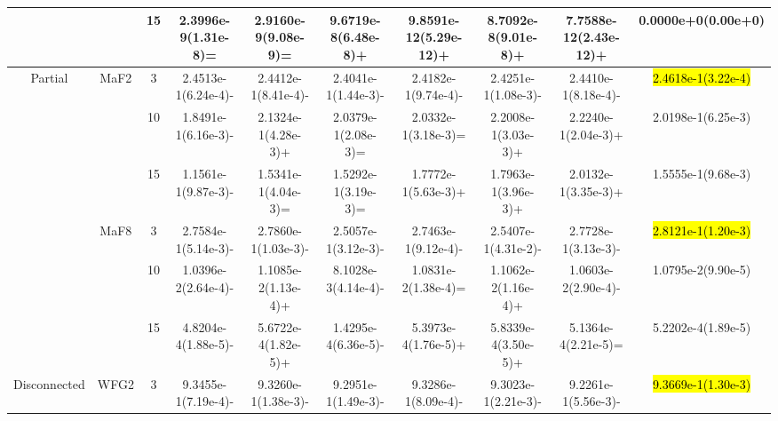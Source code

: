 \documentclass[a4paper,fleqn]{cas-dc}
\newcommand{\highlight}[1]{
	\begingroup
	\sethlcolor{Seashell}%
	\hl{#1}%
	\endgroup
}
\begin{document}
\begin{sloppypar}
\begin{table}[ht]
{\begin{tabular}{cccccccccc}
					\multirow{12}{*}{~}&\multirow{3}{*}{~} &15 &2.3996e-9(1.31e-8)= &2.9160e-9(9.08e-9)=	&9.6719e-8(6.48e-8)+	&9.8591e-12(5.29e-12)+	&8.7092e-8(9.01e-8)+	&7.7588e-12(2.43e-12)+	&0.0000e+0(0.00e+0)\\
					
					
					
					
					
					\midrule[0.35pt]
					\multirow{6}{*}{Partial}&\multirow{3}{*}{MaF2} &3 &2.4513e-1(6.24e-4)- &2.4412e-1(8.41e-4)-	&2.4041e-1(1.44e-3)-	&2.4182e-1(9.74e-4)-	&2.4251e-1(1.08e-3)-	&2.4410e-1(8.18e-4)-	&\highlight{2.4618e-1(3.22e-4)}\\ 
					
					\multirow{6}{*}{~}&\multirow{3}{*}{~} &10 &1.8491e-1(6.16e-3)- &2.1324e-1(4.28e-3)+	&2.0379e-1(2.08e-3)=	&2.0332e-1(3.18e-3)=	&2.2008e-1(3.03e-3)+	&2.2240e-1(2.04e-3)+	&2.0198e-1(6.25e-3)\\
					
					\multirow{6}{*}{~}&\multirow{3}{*}{~} &15 &1.1561e-1(9.87e-3)-	&1.5341e-1(4.04e-3)=	&1.5292e-1(3.19e-3)=	&1.7772e-1(5.63e-3)+	&1.7963e-1(3.96e-3)+	&2.0132e-1(3.35e-3)+	&1.5555e-1(9.68e-3)\\
					
					
					
					
					
					
					
					
					\multirow{6}{*}{~}&\multirow{3}{*}{MaF8} &3 &2.7584e-1(5.14e-3)- &2.7860e-1(1.03e-3)-	&2.5057e-1(3.12e-3)-	&2.7463e-1(9.12e-4)-	&2.5407e-1(4.31e-2)-	&2.7728e-1(3.13e-3)-	&\highlight{2.8121e-1(1.20e-3)}\\
					
					\multirow{6}{*}{~}&\multirow{3}{*}{~} &10 &1.0396e-2(2.64e-4)- &1.1085e-2(1.13e-4)+	&8.1028e-3(4.14e-4)-	&1.0831e-2(1.38e-4)=	&1.1062e-2(1.16e-4)+	&1.0603e-2(2.90e-4)-	&1.0795e-2(9.90e-5)\\
					
					\multirow{6}{*}{~}&\multirow{3}{*}{~} &15 &4.8204e-4(1.88e-5)- &5.6722e-4(1.82e-5)+	&1.4295e-4(6.36e-5)-	&5.3973e-4(1.76e-5)+	&5.8339e-4(3.50e-5)+	&5.1364e-4(2.21e-5)=	&5.2202e-4(1.89e-5)\\
					\midrule[0.35pt]
					
					
					
					
					\multirow{12}{*}{Disconnected}&\multirow{3}{*}{WFG2} &3 &9.3455e-1(7.19e-4)- &9.3260e-1(1.38e-3)-	&9.2951e-1(1.49e-3)-	&9.3286e-1(8.09e-4)-	&9.3023e-1(2.21e-3)-	&9.2261e-1(5.56e-3)-	&\highlight{9.3669e-1(1.30e-3)}\\
					

\end{tabular}}
\end{table}
\end{sloppypar}
\end{document}
